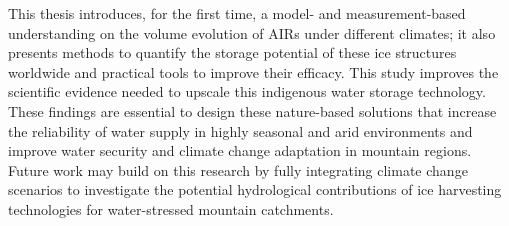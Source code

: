 This thesis introduces, for the first time, a model- and measurement-based understanding on the volume evolution
of AIRs under different climates; it also presents methods to quantify the storage potential of these ice
structures worldwide and practical tools to improve their efficacy. This study improves the scientific evidence
needed to upscale this indigenous water storage technology. These findings are essential to design these
nature-based solutions that increase the reliability of water supply in highly seasonal and arid environments
and improve water security and climate change adaptation in mountain regions. Future work may build on this
research by fully integrating climate change scenarios to investigate the potential hydrological contributions
of ice harvesting technologies for water-stressed mountain catchments.
